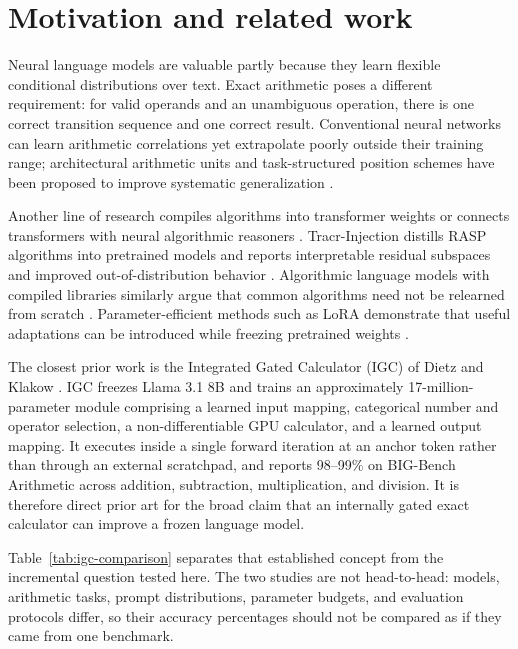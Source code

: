 \documentclass[11pt]{article}
\begin{document}
\section{Motivation and related work}

Neural language models are valuable partly because they learn flexible
conditional distributions over text. Exact arithmetic poses a different
requirement: for valid operands and an unambiguous operation, there is one
correct transition sequence and one correct result. Conventional neural
networks can learn arithmetic correlations yet extrapolate poorly outside
their training range; architectural arithmetic units and task-structured
position schemes have been proposed to improve systematic generalization
\cite{trask2018,jelassi2023,cho2024}.

Another line of research compiles algorithms into transformer weights or
connects transformers with neural algorithmic reasoners
\cite{lindner2023,bounsi2024}. Tracr-Injection distills RASP algorithms into
pretrained models and reports interpretable residual subspaces and improved
out-of-distribution behavior \cite{vergarabrowne2025}. Algorithmic language
models with compiled libraries similarly argue that common algorithms need
not be relearned from scratch \cite{saldyt2024}. Parameter-efficient methods
such as LoRA demonstrate that useful adaptations can be introduced while
freezing pretrained weights \cite{hu2021}.

The closest prior work is the Integrated Gated Calculator (IGC) of Dietz and
Klakow \cite{dietz2025}. IGC freezes Llama 3.1 8B and trains an approximately
17-million-parameter module comprising a learned input mapping, categorical
number and operator selection, a non-differentiable GPU calculator, and a
learned output mapping. It executes inside a single forward iteration at an
anchor token rather than through an external scratchpad, and reports
98--99\% on BIG-Bench Arithmetic across addition, subtraction,
multiplication, and division. It is therefore direct prior art for the broad
claim that an internally gated exact calculator can improve a frozen language
model.

Table~\ref{tab:igc-comparison} separates that established concept from the
incremental question tested here. The two studies are not head-to-head:
models, arithmetic tasks, prompt distributions, parameter budgets, and
evaluation protocols differ, so their accuracy percentages should not be
compared as if they came from one benchmark.
\end{document}
